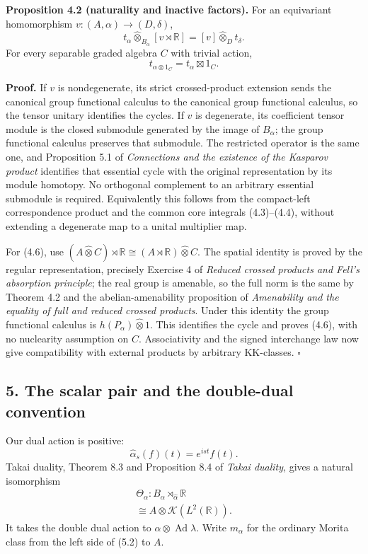 \documentclass[
  11pt,
]{article}
\begin{document}
\textbf{Proposition 4.2 (naturality and inactive factors).} For an
equivariant homomorphism \(v:(A,\alpha)\to(D,\delta)\), \[
t_\alpha\widehat\otimes_{B_\alpha}[v\rtimes\mathbb R]
 =[v]\widehat\otimes_Dt_\delta.
\tag{4.5}
\] For every separable graded algebra \(C\) with trivial action, \[
t_{\alpha\otimes1_C}=t_\alpha\boxtimes1_C.
\tag{4.6}
\]

\textbf{Proof.} If \(v\) is nondegenerate, its strict crossed-product
extension sends the canonical group functional calculus to the canonical
group functional calculus, so the tensor unitary identifies the cycles.
If \(v\) is degenerate, its coefficient tensor module is the closed
submodule generated by the image of \(B_\alpha\); the group functional
calculus preserves that submodule. The restricted operator is the same
one, and Proposition 5.1 of \emph{Connections and the existence of the
Kasparov product} identifies that essential cycle with the original
representation by its module homotopy. No orthogonal complement to an
arbitrary essential submodule is required. Equivalently this follows
from the compact-left correspondence product and the common core
integrals (4.3)--(4.4), without extending a degenerate map to a unital
multiplier map.

For (4.6), use \((A\widehat\otimes C)\rtimes\mathbb R
 \cong (A\rtimes\mathbb R)\widehat\otimes C\). The spatial identity is
proved by the regular representation, precisely Exercise 4 of
\emph{Reduced crossed products and Fell's absorption principle}; the
real group is amenable, so the full norm is the same by Theorem 4.2 and
the abelian-amenability proposition of \emph{Amenability and the
equality of full and reduced crossed products}. Under this identity the
group functional calculus is \(h(P_\alpha)\widehat\otimes1\). This
identifies the cycle and proves (4.6), with no nuclearity assumption on
\(C\). Associativity and the signed interchange law now give
compatibility with external products by arbitrary KK-classes.
\(\square\)

\subsection{5. The scalar pair and the double-dual
convention}\label{the-scalar-pair-and-the-double-dual-convention}

Our dual action is positive: \[
\widehat\alpha_s(f)(t)=e^{ist}f(t).
\tag{5.1}
\] Takai duality, Theorem 8.3 and Proposition 8.4 of \emph{Takai
duality}, gives a natural isomorphism \[
\begin{gathered}
\Theta_\alpha:B_\alpha\rtimes_{\widehat\alpha}\mathbb R\\
 \cong A\otimes\mathcal K(L^2(\mathbb R)).
\end{gathered}
\tag{5.2}
\] It takes the double dual action to
\(\alpha\otimes\operatorname{Ad}\lambda\). Write \(m_\alpha\) for the
ordinary Morita class from the left side of (5.2) to \(A\).
\end{document}
